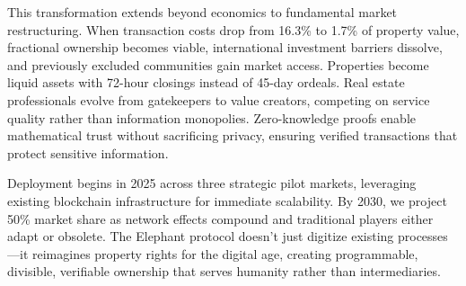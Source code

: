 This transformation extends beyond economics to fundamental market restructuring. When transaction costs drop from 16.3\% to 1.7\% of property value, fractional ownership becomes viable, international investment barriers dissolve, and previously excluded communities gain market access. Properties become liquid assets with 72-hour closings instead of 45-day ordeals. Real estate professionals evolve from gatekeepers to value creators, competing on service quality rather than information monopolies. Zero-knowledge proofs enable mathematical trust without sacrificing privacy, ensuring verified transactions that protect sensitive information.

Deployment begins in 2025 across three strategic pilot markets, leveraging existing blockchain infrastructure for immediate scalability. By 2030, we project 50\% market share as network effects compound and traditional players either adapt or obsolete. The Elephant protocol doesn't just digitize existing processes---it reimagines property rights for the digital age, creating programmable, divisible, verifiable ownership that serves humanity rather than intermediaries.

